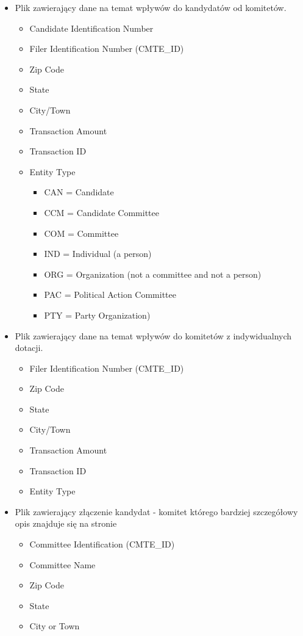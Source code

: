 \documentclass[10pt,a4paper]{article}
\begin{document}
\begin{itemize}
\item Plik zawierający dane na temat wpływów do kandydatów od komitetów. \cite{fecContToCandFromComit}
\begin{itemize}
\item Candidate Identification Number
\item Filer Identification Number (CMTE\_ID)
\item Zip Code
\item State
\item City/Town
\item Transaction Amount
\item Transaction ID
\item Entity Type
\begin{itemize}
\item CAN = Candidate
\item CCM = Candidate Committee
\item COM = Committee
\item IND = Individual (a person)
\item ORG = Organization (not a committee and not a person)
\item PAC = Political Action Committee
\item PTY = Party Organization)
\end{itemize}
\end{itemize}

\item Plik zawierający dane na temat wpływów do komitetów z indywidualnych dotacji.
\cite{fecIndividualContributionMasterFileDescriptionSite2015}

\begin{itemize}
\item Filer Identification Number (CMTE\_ID)
\item Zip Code
\item State
\item City/Town
\item Transaction Amount
\item Transaction ID
\item Entity Type 
\end{itemize}

\item Plik zawierający złączenie kandydat - komitet którego bardziej szczegółowy opis znajduje się na stronie \cite{fecCandidateComiteeLinkageFile2015} 


\begin{itemize}
\item Committee Identification (CMTE\_ID)
\item Committee Name
\item Zip Code
\item State
\item City or Town
\end{itemize}



\end{itemize}
\end{document}
